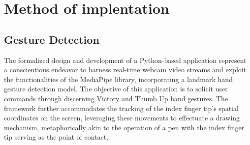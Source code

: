 \documentclass[journal]{IEEEtran}
\begin{document}
%




\section{Method of implentation}
\subsection*{Gesture Detection}
The formalized design and development of a Python-based application represent a conscientious endeavor to harness real-time webcam 
video streams and exploit the functionalities of the MediaPipe library, incorporating a landmark hand gesture detection model. 
The objective of this application is to solicit user commands through discerning Victory and Thumb Up hand gestures. The framework 
further accommodates the tracking of the index finger tip's spatial coordinates on the screen, leveraging these movements to 
effectuate a drawing mechanism, metaphorically akin to the operation of a pen with the index finger tip serving as the point of contact.
\end{document}

